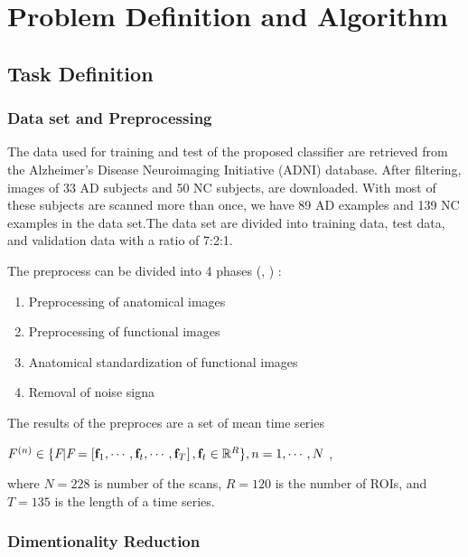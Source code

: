 \section{Problem Definition and Algorithm}

\subsection{Task Definition}

\subsubsection{Data set and Preprocessing}

The data used for training and test of the proposed classifier are retrieved from the Alzheimer's Disease Neuroimaging Initiative (ADNI) database. After filtering, images of 33 AD subjects and 50 NC subjects,  are downloaded. With most of these subjects are scanned more than once, we have 89 AD examples and 139 NC examples in the data set.The data set are divided into training data, test data, and validation data with a ratio of 7:2:1.

The preprocess can be divided into 4 phases (\cite{suk}, \cite{chen}) :
	\begin{enumerate}
	\item Preprocessing of anatomical images
	\item  Preprocessing of functional images
	\item Anatomical standardization of functional images
	\item Removal of noise signa
	\end{enumerate}

The results of the preproces are a set of mean time series 
\begin{center}
$ F^{(n)} \in \{ \emph{F} | \emph{F} = \left[ \textbf{f}_1, \cdots, \textbf{f}_t, \cdots, \textbf{f}_T \right],  \textbf{f}_t \in  \mathbb{R}^{R} \}, n=1,  \cdots, N$ ,
\end{center}
where $N=228$ is number of the scans, $R=120$ is the number of  ROIs, and $T=135$ is the length of a time series. 

\subsubsection{Dimentionality Reduction}

